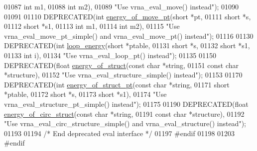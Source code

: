 \begin{DoxyCode}
01087                                 \textcolor{keywordtype}{int}         m1,
01088                                 \textcolor{keywordtype}{int}         m2),
01089            \textcolor{stringliteral}{"Use vrna\_eval\_move() instead"});
01090 
01091 
01110 DEPRECATED(\textcolor{keywordtype}{int} \hyperlink{group__eval_ga49e0ee561be69faf0568213546f6a53f}{energy\_of\_move\_pt}(\textcolor{keywordtype}{short}  *pt,
01111                                  \textcolor{keywordtype}{short}  *s,
01112                                  \textcolor{keywordtype}{short}  *s1,
01113                                  \textcolor{keywordtype}{int}    m1,
01114                                  \textcolor{keywordtype}{int}    m2),
01115            \textcolor{stringliteral}{"Use vrna\_eval\_move\_pt\_simple() and vrna\_eval\_move\_pt() instead"});
01116 
01130 DEPRECATED(\textcolor{keywordtype}{int}   \hyperlink{group__eval_ga507d4fd93f4b398d793ba2402731388d}{loop\_energy}(\textcolor{keywordtype}{short}  *ptable,
01131                              \textcolor{keywordtype}{short}  *s,
01132                              \textcolor{keywordtype}{short}  *s1,
01133                              \textcolor{keywordtype}{int}    i),
01134            \textcolor{stringliteral}{"Use vrna\_eval\_loop\_pt() instead"});
01135 
01150 DEPRECATED(\textcolor{keywordtype}{float} \hyperlink{group__eval_gac2b37fea2145c94d925a3f33378ef87b}{energy\_of\_struct}(\textcolor{keyword}{const} \textcolor{keywordtype}{char}  *\textcolor{keywordtype}{string},
01151                                   \textcolor{keyword}{const} \textcolor{keywordtype}{char}  *structure),
01152            \textcolor{stringliteral}{"Use vrna\_eval\_structure\_simple() instead"});
01153 
01170 DEPRECATED(\textcolor{keywordtype}{int} \hyperlink{group__eval_ga27ce6f68512d43bf1fe14a06c9d76d5c}{energy\_of\_struct\_pt}(\textcolor{keyword}{const} \textcolor{keywordtype}{char} *\textcolor{keywordtype}{string},
01171                                    \textcolor{keywordtype}{short}      *ptable,
01172                                    \textcolor{keywordtype}{short}      *s,
01173                                    \textcolor{keywordtype}{short}      *s1),
01174            \textcolor{stringliteral}{"Use vrna\_eval\_structure\_pt\_simple() instead"});
01175 
01190 DEPRECATED(\textcolor{keywordtype}{float} \hyperlink{group__eval_ga657222e2758c46bf13b416ef3032e417}{energy\_of\_circ\_struct}(\textcolor{keyword}{const} \textcolor{keywordtype}{char} *\textcolor{keywordtype}{string},
01191                                        \textcolor{keyword}{const} \textcolor{keywordtype}{char} *structure),
01192            \textcolor{stringliteral}{"Use vrna\_eval\_circ\_structure\_simple() and vrna\_eval\_structure() instead"});
01193 
01194 \textcolor{comment}{/* End deprecated eval interface */}
01197 \textcolor{preprocessor}{#endif}
01198 
01203 \textcolor{preprocessor}{#endif}
\end{DoxyCode}
